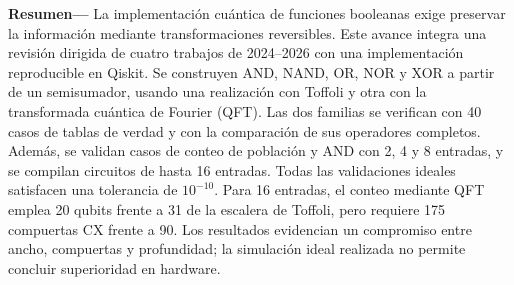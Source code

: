 \documentclass[10pt,a4paper,twocolumn]{article}
\begin{document}

\noindent\textbf{Resumen---}
La implementación cuántica de funciones booleanas exige preservar la información
mediante transformaciones reversibles. Este avance integra una revisión dirigida
de cuatro trabajos de 2024--2026 con una implementación reproducible en Qiskit.
Se construyen AND, NAND, OR, NOR y XOR a partir de un semisumador, usando una
realización con Toffoli y otra con la transformada cuántica de Fourier (QFT).
Las dos familias se verifican con 40 casos de tablas de verdad y con la comparación
de sus operadores completos. Además, se validan \ValidationCases{} casos de
conteo de población y AND con 2, 4 y 8 entradas, y se compilan circuitos de hasta
16 entradas. Todas las validaciones ideales satisfacen una tolerancia de
$10^{-10}$. Para 16 entradas, el conteo mediante QFT emplea 20 qubits frente a
31 de la escalera de Toffoli, pero requiere 175 compuertas CX frente a 90.
Los resultados evidencian un compromiso entre ancho, compuertas y profundidad;
la simulación ideal realizada no permite concluir superioridad en hardware.
\end{document}
